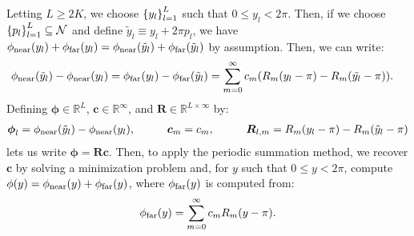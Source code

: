 Letting $L \geq 2K$, we choose $\left\{y_l\right\}_{l=1}^L$ such that
$0 \leq y_l < 2\pi$. Then, if we choose
$\left\{p_l\right\}_{l=1}^L \subseteq \mathcal{N}$ and define
$\tilde{y}_l \equiv y_l + 2\pi p_l$, we have
$\phi_{\operatorname{near}}(y_l) + \phi_{\operatorname{far}}(y_l) = \phi_{\operatorname{near}}(\tilde{y}_l) +
\phi_{\operatorname{far}}(\tilde{y}_l)$ by assumption. Then, we can write:
\begin{align*}
  \phi_{\operatorname{near}}(\tilde{y}_l) - \phi_{\operatorname{near}}(y_l) &= \phi_{\operatorname{far}}(y_l) - \phi_{\operatorname{far}}(\tilde{y}_l) = \sum_{m=0}^\infty c_m (R_m(y_l - \pi) - R_m(\tilde{y_l} - \pi)).
\end{align*}
Defining $\boldsymbol{\phi} \in \mathbb{R}^{L}$, $\boldsymbol{c} \in \mathbb{R}^\infty$, and $\boldsymbol{R} \in \mathbb{R}^{L \times \infty}$
by:
\begin{align*}
  \boldsymbol{\phi}_l = \phi_{\operatorname{near}}(\tilde{y}_l) - \phi_{\operatorname{near}}(y_l), \hspace{1cm} \boldsymbol{c}_m = c_m, \hspace{1cm} \boldsymbol{R}_{l,m} = R_m(y_l - \pi) - R_m(\tilde{y}_l - \pi)
\end{align*}
lets us write $\boldsymbol{\phi} = \boldsymbol{R}
\boldsymbol{c}$. Then, to apply the periodic summation method, we
recover $\boldsymbol{c}$ by solving a minimization problem and, for
$y$ such that $0 \leq y < 2\pi$, compute
$\phi(y) = \phi_{\operatorname{near}}(y) + \phi_{\operatorname{far}}(y)$, where $\phi_{\operatorname{far}}(y)$ is computed
from:
\begin{align*}
  \phi_{\operatorname{far}}(y) = \sum_{m=0}^\infty c_m R_m(y - \pi).
\end{align*}

